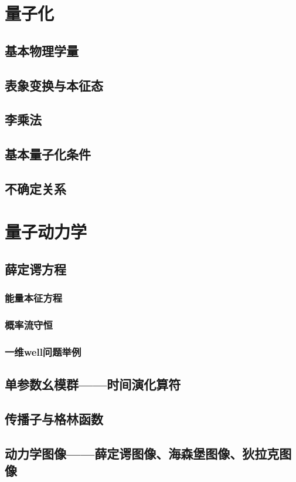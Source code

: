\documentclass[a4paper,11pt]{article}
\theoremstyle{mystyle}
\begin{document}
\section{量子化}
\subsection{基本物理学量}
\subsection{表象变换与本征态}
\subsection{李乘法}
\subsection{基本量子化条件}
\subsection{不确定关系}
\section{量子动力学}
\subsection{薛定谔方程}
\subsubsection{能量本征方程}
\subsubsection{概率流守恒}
\subsubsection{一维well问题举例}
\subsection{单参数幺模群——时间演化算符}
\subsection{传播子与格林函数}
\subsection{动力学图像——薛定谔图像、海森堡图像、狄拉克图像}
\end{document}
